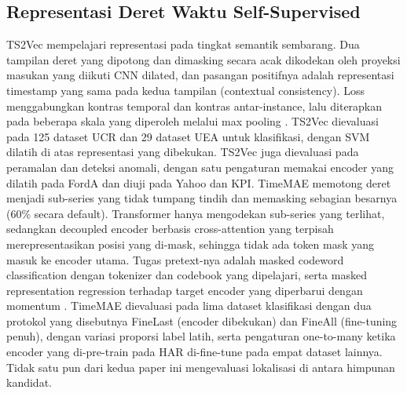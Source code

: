 \subsection{Representasi Deret Waktu Self-Supervised}
TS2Vec mempelajari representasi pada tingkat semantik sembarang. Dua tampilan deret yang dipotong dan dimasking secara acak dikodekan oleh proyeksi masukan yang diikuti CNN dilated, dan pasangan positifnya adalah representasi timestamp yang sama pada kedua tampilan (contextual consistency). Loss menggabungkan kontras temporal dan kontras antar-instance, lalu diterapkan pada beberapa skala yang diperoleh melalui max pooling \cite{yue2022ts2vec}. TS2Vec dievaluasi pada 125 dataset UCR dan 29 dataset UEA untuk klasifikasi, dengan SVM dilatih di atas representasi yang dibekukan. TS2Vec juga dievaluasi pada peramalan dan deteksi anomali, dengan satu pengaturan memakai encoder yang dilatih pada FordA dan diuji pada Yahoo dan KPI. TimeMAE memotong deret menjadi sub-series yang tidak tumpang tindih dan memasking sebagian besarnya (60\% secara default). Transformer hanya mengodekan sub-series yang terlihat, sedangkan decoupled encoder berbasis cross-attention yang terpisah merepresentasikan posisi yang di-mask, sehingga tidak ada token mask yang masuk ke encoder utama. Tugas pretext-nya adalah masked codeword classification dengan tokenizer dan codebook yang dipelajari, serta masked representation regression terhadap target encoder yang diperbarui dengan momentum \cite{cheng2026timemae}. TimeMAE dievaluasi pada lima dataset klasifikasi dengan dua protokol yang disebutnya FineLast (encoder dibekukan) dan FineAll (fine-tuning penuh), dengan variasi proporsi label latih, serta pengaturan one-to-many ketika encoder yang di-pre-train pada HAR di-fine-tune pada empat dataset lainnya. Tidak satu pun dari kedua paper ini mengevaluasi lokalisasi di antara himpunan kandidat.

